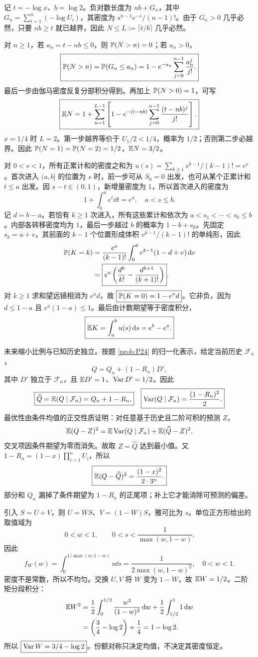 记 $t=-\log x$、$b=\log2$。负对数长度为 $nb+G_n$，其中 $G_n=\sum_{i=1}^n(-\log U_i)$，其密度为 $s^{n-1}e^{-s}/(n-1)!$。由于 $G_n>0$ 几乎必然，只要 $nb\ge t$ 就已越界，因此 $N\le L:=\lceil t/b\rceil$ 几乎必然。

对 $n\ge1$，若 $a_n=t-nb\le0$，则 $\mathbb{P}(N>n)=0$；若 $a_n>0$，
\[
\boxed{\mathbb{P}(N>n)=\mathbb{P}(G_n\le a_n)
=1-e^{-a_n}\sum_{j=0}^{n-1}\frac{a_n^j}{j!}.}
\]
最后一步由伽马密度反复分部积分得到。再加上 $\mathbb{P}(N>0)=1$，可写
\[
\boxed{\mathbb{E} N=1+\sum_{n=1}^{L-1}
\left[1-e^{-(t-nb)}\sum_{j=0}^{n-1}\frac{(t-nb)^j}{j!}\right].}
\]
$x=1/4$ 时 $L=2$。第一步越界等价于 $U_1/2<1/4$，概率为 $1/2$；否则第二步必越界。因此 $\mathbb{P}(N=1)=\mathbb{P}(N=2)=1/2$，$\mathbb{E} N=3/2$。

对 $0<s<1$，所有正累计和的密度之和为 $u(s)=\sum_{k\ge1}s^{k-1}/(k-1)!=e^s$。首次进入 $(a,b]$ 的位置为 $s$ 时，前一步可从 $S_0=0$ 出发，也可从某个正累计和 $t\le a$ 出发。因 $s-t\in(0,1)$，新增量密度为 $1$，所以首次进入的密度为
\[
1+\int_0^a e^t\dd t=e^a,\quad a<s\le b.
\]
记 $d=b-a$。若恰有 $k\ge1$ 次进入，所有这些累计和依次为 $a<s_1<\cdots<s_k\le b$。内部各转移密度均为 $1$，最后一步越过 $b$ 的概率为 $1-b+s_k$。先固定 $s_k=a+v$，其前面的 $k-1$ 个位置形成体积 $v^{k-1}/(k-1)!$ 的单纯形，因此
\[
\begin{aligned}
\mathbb{P}(K=k)
&=\frac{e^a}{(k-1)!}\int_0^d v^{k-1}(1-d+v)\,\mathrm{d} v\\
&=\boxed{e^a\left(\frac{d^k}{k!}-\frac{d^{k+1}}{(k+1)!}\right)}.
\end{aligned}
\]
对 $k\ge1$ 求和望远镜相消为 $e^ad$，故 $\boxed{\mathbb{P}(K=0)=1-e^ad}$。它非负，因为 $d\le1-a$ 且 $e^a(1-a)\le1$。最后由计数期望等于密度积分，
\[
\boxed{\mathbb{E} K=\int_a^bu(s)\,\mathrm{d} s=e^b-e^a.}
\]

未来缩小比例与已知历史独立。按题 \ref{prob:P24} 的归一化表示，给定当前历史 $\mathcal F_n$，
\[
Q=Q_n+(1-R_n)D',
\]
其中 $D'$ 独立于 $\mathcal F_n$，且 $\mathbb{E} D'=1$、$\operatorname{Var} D'=1/2$。因此
\[
\boxed{\widehat Q=\mathbb{E}(Q\mid\mathcal F_n)=Q_n+1-R_n,}
\quad
\boxed{\operatorname{Var}(Q\mid\mathcal F_n)=\frac{(1-R_n)^2}{2}.}
\]
最优性由条件均值的正交性质证明：对任意基于历史且二阶可积的预测 $Z$，
\[
\mathbb{E}(Q-Z)^2=\mathbb{E}\operatorname{Var}(Q\mid\mathcal F_n)+\mathbb{E}(\widehat Q-Z)^2,
\]
交叉项因条件期望为零而消失。故取 $Z=\widehat Q$ 达到最小值。又 $1-R_n=(1-x)\prod_{i=1}^nU_i$，所以
\[
\boxed{\mathbb{E}(Q-\widehat Q)^2=\frac{(1-x)^2}{2\cdot3^n}.}
\]
部分和 $Q_n$ 漏掉了条件期望为 $1-R_n$ 的正尾项；补上它才能消除可预测的偏差。

引入 $S=U+V$，则 $U=WS$、$V=(1-W)S$，雅可比为 $s$。单位正方形给出的取值域为
\[
0<w<1,\qquad 0<s<\frac1{\max(w,1-w)}.
\]
因此
\[
\boxed{f_W(w)=\int_0^{1/\max(w,1-w)}s\dd s
=\frac1{2\max(w,1-w)^2},\quad0<w<1.}
\]
密度不是常数，所以不均匀。交换 $U,V$ 将 $W$ 变为 $1-W$，故 $\mathbb{E} W=1/2$。二阶矩分段积分：
\[
\begin{aligned}
\mathbb{E} W^2&=\frac12\int_0^{1/2}\frac{w^2}{(1-w)^2}\,\mathrm{d} w
+\frac12\int_{1/2}^1 1\,\mathrm{d} w\\
&=\left(\frac34-\log2\right)+\frac14=1-\log2.
\end{aligned}
\]
所以 $\boxed{\operatorname{Var} W=3/4-\log2}$。份额对称只决定均值，不决定其密度恒定。

